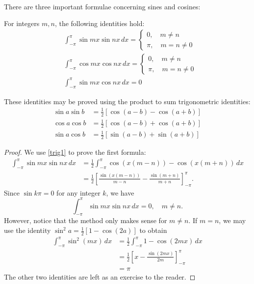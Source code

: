 \documentclass{amsart}
\begin{document}
  There are three important formulae concerning sines and cosines:
  \begin{theorem}
    For integers $m, n$, the following identities hold:
    \begin{align*}
      &\int_{-\pi}^{\pi} \sin mx \sin nx\, dx = \begin{cases} 0, \quad m\neq n \\ \pi, \quad m = n \neq 0 \end{cases} \\
      &\int_{-\pi}^{\pi} \cos mx \cos nx\, dx = \begin{cases} 0, \quad m\neq n \\ \pi, \quad m = n \neq 0 \end{cases} \\
      &\int_{-\pi}^{\pi} \sin mx \cos nx\, dx = 0
    \end{align*}
  \end{theorem}
  These identities may be proved using the product to sum trigonometric identities:
  \begin{align}
    \sin a \sin b &= \frac{1}{2}[\cos(a-b) - \cos(a+b)] \label{trig1}\\
    \cos a \cos b &= \frac{1}{2} [\cos (a-b) + \cos(a+b)] \label {trig2}\\
    \sin a \cos b &= \frac{1}{2}[\sin (a-b) + \sin(a+b)] \label{trig3}
  \end{align}
  \begin{proof}
    We use \ref{trig1} to prove the first formula:
    \begin{align*}
      \int_{-\pi}^{\pi} \sin mx \sin nx\, dx &= \frac{1}{2} \int_{-\pi}^{\pi} \cos(x(m-n)) - \cos(x(m+n))\, dx \\
                                             &= \frac{1}{2} \left[ \frac{\sin(x(m-n))}{m-n} - \frac{\sin(m+n)}{m+n} \right]_{-\pi}^{\pi}.
    \end{align*}
    Since $\sin k\pi = 0$ for any integer $k$, we have \[
      \int_{-\pi}^{\pi} \sin mx \sin nx \, dx = 0, \quad m\neq n
    .\] However, notice that the method only makes sense for $m\neq n$. If $m = n$, we may use the identity $\sin^2 a = \frac{1}{2}[1 - \cos(2a)]$ to obtain 
    \begin{align*}
      \int_{-\pi}^{\pi} \sin^2(mx)\, dx &= \frac{1}{2} \int_{-\pi}^{\pi} 1 - \cos(2mx)\, dx \\
                                        &= \frac{1}{2} \left[ x - \frac{\sin (2mx)}{2m} \right]_{-\pi}^{\pi} \\
                                        &= \pi
    \end{align*}
    The other two identities are left as an exercise to the reader.
  \end{proof}
\end{document}
